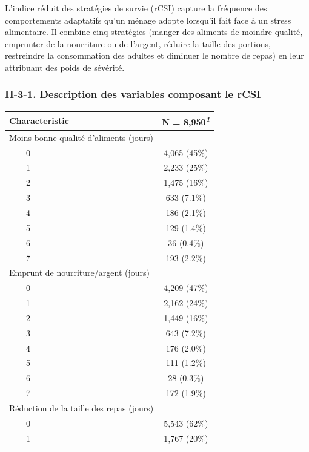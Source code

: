 \documentclass[
]{article}
\begin{document}
L'indice réduit des stratégies de survie (rCSI) capture la fréquence des
comportements adaptatifs qu'un ménage adopte lorsqu'il fait face à un
stress alimentaire. Il combine cinq stratégies (manger des aliments de
moindre qualité, emprunter de la nourriture ou de l'argent, réduire la
taille des portions, restreindre la consommation des adultes et diminuer
le nombre de repas) en leur attribuant des poids de sévérité.

\hypertarget{ii-3-1.-description-des-variables-composant-le-rcsi}{%
\subsubsection{II-3-1. Description des variables composant le
rCSI}\label{ii-3-1.-description-des-variables-composant-le-rcsi}}

\begin{table}[!t]
\fontsize{9.8pt}{11.7pt}\selectfont
\begin{tabular*}{\linewidth}{@{\extracolsep{\fill}}lc}
\toprule
\textbf{Characteristic} & \textbf{N = 8,950}\textsuperscript{\textit{1}} \\ 
\midrule\addlinespace[2.5pt]
Moins bonne qualité d’aliments (jours) &  \\ 
    0 & 4,065 (45\%) \\ 
    1 & 2,233 (25\%) \\ 
    2 & 1,475 (16\%) \\ 
    3 & 633 (7.1\%) \\ 
    4 & 186 (2.1\%) \\ 
    5 & 129 (1.4\%) \\ 
    6 & 36 (0.4\%) \\ 
    7 & 193 (2.2\%) \\ 
Emprunt de nourriture/argent (jours) &  \\ 
    0 & 4,209 (47\%) \\ 
    1 & 2,162 (24\%) \\ 
    2 & 1,449 (16\%) \\ 
    3 & 643 (7.2\%) \\ 
    4 & 176 (2.0\%) \\ 
    5 & 111 (1.2\%) \\ 
    6 & 28 (0.3\%) \\ 
    7 & 172 (1.9\%) \\ 
Réduction de la taille des repas (jours) &  \\ 
    0 & 5,543 (62\%) \\ 
    1 & 1,767 (20\%) \\ 

\end{tabular*}
\end{table}
\end{document}
